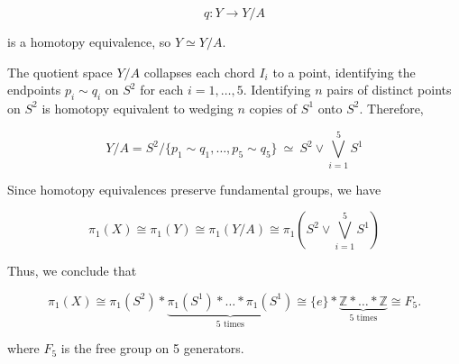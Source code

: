 \documentclass{article}
\begin{document}
	$$q: Y \longrightarrow Y / A$$
	
	is a homotopy equivalence, so $Y \simeq Y / A$.
	
	The quotient space $Y / A$ collapses each chord $I_i$ to a point, identifying the endpoints $p_i \sim q_i$ on $S^2$ for each $i = 1, \dots, 5$. Identifying $n$ pairs of distinct points on $S^2$ is homotopy equivalent to wedging $n$ copies of $S^1$ onto $S^2$. Therefore,
	
	$$Y / A = S^2 / \{p_1 \sim q_1, \dots, p_5 \sim q_5\} \ \simeq \ S^2 \vee \bigvee_{i=1}^5 S^1$$
	
	Since homotopy equivalences preserve fundamental groups, we have
	
	$$\pi_1(X) \cong \pi_1(Y) \cong \pi_1(Y / A) \cong \pi_1\left(S^2 \vee \bigvee_{i=1}^5 S^1\right)$$
	
	Thus, we conclude that
	
	$$\pi_1(X) \cong \pi_1(S^2) * \underbrace{\pi_1(S^1) * \dots * \pi_1(S^1)}_{5 \text{ times}} \cong \{e\} * \underbrace{\mathbb{Z} * \dots * \mathbb{Z}}_{5 \text{ times}} \cong F_5.$$
	
	where $F_5$ is the free group on 5 generators.
	
\end{document}
